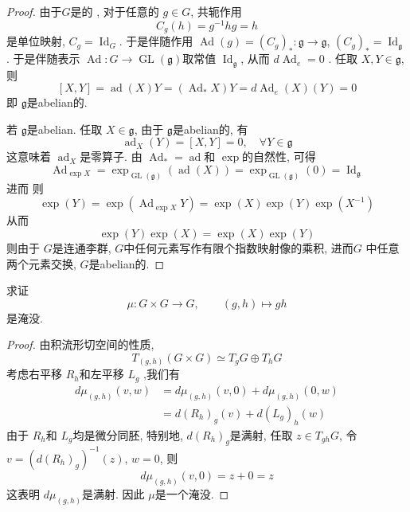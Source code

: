 \documentclass[../main.tex]{subfiles}
\begin{document}
\begin{proof}
    由于\(  G  \)是的 , 对于任意的 \(  g\in G  \), 共轭作用 \[
    C_{g}\left( h \right)= g^{-1} hg = h 
    \]是单位映射,  \(  C_{g}= \operatorname{Id}_{G}  \). 于是伴随作用 \(  \operatorname{Ad} \left( g \right)=  \left( C_{g} \right) _{*}  : \mathfrak{g}\to \mathfrak{g} \), \(  \left( C_{g} \right)_{*}= \operatorname{Id}_{\mathfrak{g}}   \). 于是伴随表示 \(  \operatorname{Ad}: G\to  \operatorname{GL}\left( \mathfrak{g} \right)    \)取常值 \(  \operatorname{Id}_{\mathfrak{g}}  \), 从而 \(  d \operatorname{Ad}_{e}= 0  \) .      
   任取 \(  X,Y\in \mathfrak{g}  \), 则 \[
   [X,Y]= \operatorname{ad}\left( X \right)Y=\left( \operatorname{Ad}_{*}X \right)Y  = d \operatorname{Ad}_{e}\left( X \right)\left( Y \right)  = 0
   \] 即 \(  \mathfrak{g}  \)是abelian的.
   
   若 \(  \mathfrak{g}  \)是abelian. 任取 \(  X \in \mathfrak{g}  \), 由于 \(  \mathfrak{g}  \)是abelian的, 有 \[
   \operatorname{ad}_{X}\left( Y \right)= [X,Y]= 0,\quad \forall Y\in \mathfrak{g} 
   \]这意味着 \(  \operatorname{ad}_{X}  \)是零算子.   
   由 \(  \operatorname{Ad}_{*}= \operatorname{ad}  \)和 \(  \exp   \)的自然性, 可得 \[
   \operatorname{Ad}_{\exp X}= \exp _{\operatorname{GL} \left( \mathfrak{g} \right) }\left( \operatorname{ad}\left( X \right)  \right) = \exp _{\operatorname{GL} \left( \mathfrak{g} \right) }\left( 0 \right)= \operatorname{Id}_{\mathfrak{g}} 
   \]  进而 则 \[
  \exp \left( Y \right)=  \exp \left( \operatorname{Ad}_{\exp X} Y\right)= \exp \left( X \right)\exp \left( Y \right)\exp \left( X ^{-1}  \right)    
   \] 从而 \[
   \exp \left( Y \right)\exp \left( X \right)= \exp \left( X \right)\exp \left( Y \right)    
   \]则由于 \(  G  \)是连通李群, \(  G  \)中任何元素写作有限个指数映射像的乘积, 进而\(  G  \) 中任意两个元素交换, \(  G  \)是abelian的.    
\end{proof}

\begin{exercise}{}{}
求证
\[
\mu:G\times G\to G,\qquad (g,h)\mapsto gh
\]
是淹没.
\end{exercise}

\begin{proof}
    由积流形切空间的性质, \[
    T_{\left( g,h \right) }\left( G\times G \right)\simeq T_{g}G\oplus T_{h}G 
    \]考虑右平移 \(  R_{h}  \)和左平移 \(  L_{g}  \)  ,我们有 \[
  \begin{aligned}
    d \mu _{\left( g,h \right) }\left( v,w \right)&= d \mu _{\left( g,h \right) }\left( v,0 \right)+ d \mu _{\left( g,h \right) }\left( 0,w \right)   \\ 
     &= d\left( R_{h} \right)_{g}\left( v \right)+ d \left( L_{g} \right)_{h}\left( w \right)    
  \end{aligned}
    \]由于 \(  R_{h}  \)和 \(  L_{g}  \)均是微分同胚,   特别地, \(  d \left( R_{h} \right)_{g}   \)是满射, 任取 \(  z\in T_{gh}G  \), 令 \(  v= \left( d\left( R_{h} \right)_{g}  \right)^{-1}    \left( z \right) \), \(  w= 0  \), 则 \[
    d \mu _{\left( g,h \right) }\left( v,0 \right)= z+ 0= z 
    \]    这表明 \(   d \mu _{\left( g,h \right) }  \)是满射. 因此 \(  \mu   \)是一个淹没.  
\end{proof}
\end{document}
